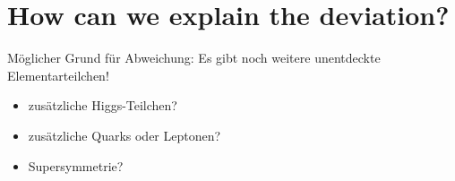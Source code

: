 \documentclass[12pt]{beamer}
\begin{document}

\section{How can we explain the deviation?}

\begin{frame}{\insertsection}
  Möglicher Grund für Abweichung: Es gibt noch weitere unentdeckte
  Elementarteilchen!
  \begin{itemize}
  \item zusätzliche Higgs-Teilchen?
  \item zusätzliche Quarks oder Leptonen?
  \item Supersymmetrie?
  \end{itemize}
\end{frame}
\end{document}

